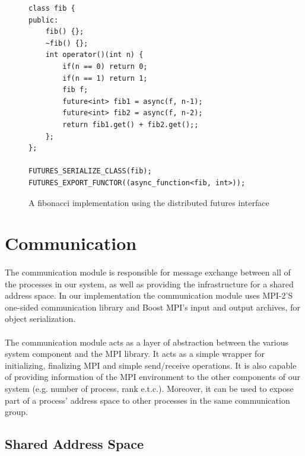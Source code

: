 \begin{figure}[!ht]
\begin{lstlisting}
class fib {
public:
	fib() {};
	~fib() {};
	int	operator()(int n) {
		if(n == 0) return 0;
		if(n == 1) return 1;
		fib f;
		future<int> fib1 = async(f, n-1);
		future<int> fib2 = async(f, n-2);
		return fib1.get() + fib2.get();;
	};
};

FUTURES_SERIALIZE_CLASS(fib);
FUTURES_EXPORT_FUNCTOR((async_function<fib, int>));

\end{lstlisting}
\caption{A fibonacci implementation using the distributed futures interface}
\label{lst:fib}
\end{figure}



\section{Communication}
\label{sect:communication}

\paragraph{}
The communication module is responsible for message exchange between all of the processes in our system,
as well as providing the infrastructure for a shared address space.
In our implementation the communication module uses MPI-2'S one-sided communication library and Boost MPI's
input and output archives, for object serialization.

\paragraph{}
The communication module acts as a layer of abstraction between the various system component and the MPI library.
It acts as a simple wrapper for initializing, finalizing MPI and simple send/receive operations.
It is also capable of providing information of the MPI environment to the other components of our system (e.g.
number of process, rank e.t.c.).  Moreover, it can be used to expose part of a process' address space to other 
processes in the same communication group.  

\subsection{Shared Address Space}
